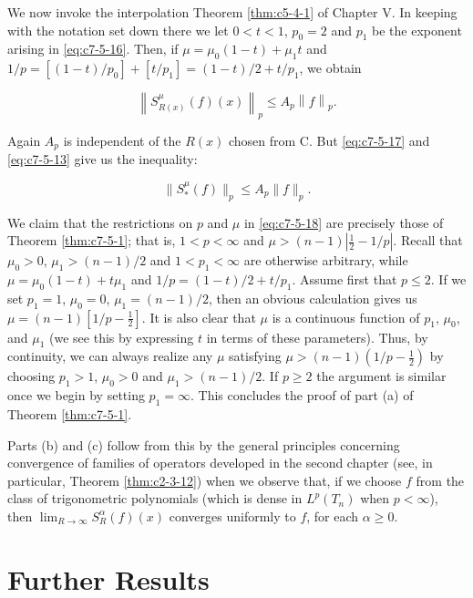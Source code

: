 We now invoke the interpolation Theorem \ref{thm:c5-4-1} of Chapter V. In keeping with the notation set down there we let $0 < t < 1$, $p_0 = 2$ and $p_1$ be the exponent arising in \eqref{eq:c7-5-16}. Then, if $\mu = \mu_0(1 - t) + \mu_1 t$ and $1/p = [(1 - t)/p_0] + [t/p_1] = (1 - t)/2 + t/p_1$, we obtain

\begin{equation}\label{eq:c7-5-17}
\left\|S_{R(x)}^{\mu}(f)(x)\right\|_{p}\leq A_{p}\left\|f\right\|_{p}.
\end{equation}

Again $A_{p}$ is independent of the $R(x)$ chosen from C. But \eqref{eq:c7-5-17} and \eqref{eq:c7-5-13} give us the inequality:

\begin{equation}\label{eq:c7-5-18}
\|S_{*}^{\mu}(f)\|_{p}\leq A_{p}\|f\|_{p}.
\end{equation}

We claim that the restrictions on $p$ and $\mu$ in \eqref{eq:c7-5-18} are precisely those of Theorem \ref{thm:c7-5-1}; that is, $1 < p < \infty$ and $\mu > (n-1)\left|\frac{1}{2} - 1/p\right|$. Recall that $\mu_0 > 0$, $\mu_1 > (n-1)/2$ and $1 < p_1 < \infty$ are otherwise arbitrary, while $\mu = \mu_0(1-t) + t\mu_1$ and $1/p = (1-t)/2 + t/p_1$. Assume first that $p \leq 2$. If we set $p_1 = 1$, $\mu_0 = 0$, $\mu_1 = (n-1)/2$, then an obvious calculation gives us $\mu = (n-1)[1/p-\frac{1}{2}]$. It is also clear that $\mu$ is a continuous function of $p_1$, $\mu_0$, and $\mu_1$ (we see this by expressing $t$ in terms of these parameters). Thus, by continuity, we can always realize any $\mu$ satisfying $\mu > (n-1)(1/p-\frac{1}{2})$ by choosing $p_1 > 1$, $\mu_0 > 0$ and $\mu_1 > (n-1)/2$. If $p \geq 2$ the argument is similar once we begin by setting $p_1 = \infty$. This concludes the proof of part (a) of Theorem \ref{thm:c7-5-1}.

Parts (b) and (c) follow from this by the general principles concerning convergence of families of operators developed in the second chapter (see, in particular, Theorem \ref{thm:c2-3-12}) when we observe that, if we choose $f$ from the class of trigonometric polynomials (which is dense in $L^{p}(T_{n})$ when $p < \infty$), then $\lim_{R \to \infty} S_{R}^{\alpha}(f)(x)$ converges uniformly to $f$, for each $\alpha \geq 0$.

\section{Further Results}

